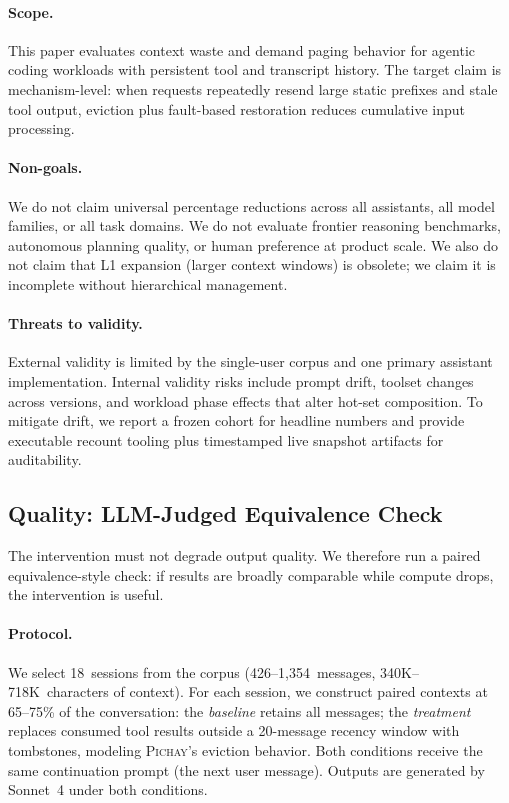 \paragraph{Scope.}
This paper evaluates context waste and demand paging behavior for
agentic coding workloads with persistent tool and transcript history.
The target claim is mechanism-level: when requests repeatedly resend
large static prefixes and stale tool output, eviction plus fault-based
restoration reduces cumulative input processing.

\paragraph{Non-goals.}
We do not claim universal percentage reductions across all assistants,
all model families, or all task domains. We do not evaluate frontier
reasoning benchmarks, autonomous planning quality, or human preference
at product scale. We also do not claim that L1 expansion (larger
context windows) is obsolete; we claim it is incomplete without
hierarchical management.

\paragraph{Threats to validity.}
External validity is limited by the single-user corpus and one primary
assistant implementation. Internal validity risks include prompt drift,
toolset changes across versions, and workload phase effects that alter
hot-set composition. To mitigate drift, we report a frozen cohort for
headline numbers and provide executable recount tooling plus
timestamped live snapshot artifacts for auditability.

\subsection{Quality: LLM-Judged Equivalence Check}
\label{sec:quality}

The intervention must not degrade output quality. We therefore run a
paired equivalence-style check: if results are broadly comparable while
compute drops, the intervention is useful.

\paragraph{Protocol.}
We select 18~sessions from the corpus (426--1{,}354~messages,
340K--718K~characters of context). For each session, we construct
paired contexts at 65--75\% of the conversation: the \emph{baseline}
retains all messages; the \emph{treatment} replaces consumed tool
results outside a 20-message recency window with tombstones, modeling
\textsc{Pichay}'s eviction behavior. Both conditions receive the same
continuation prompt (the next user message). Outputs are generated by
Sonnet~4 under both conditions.

